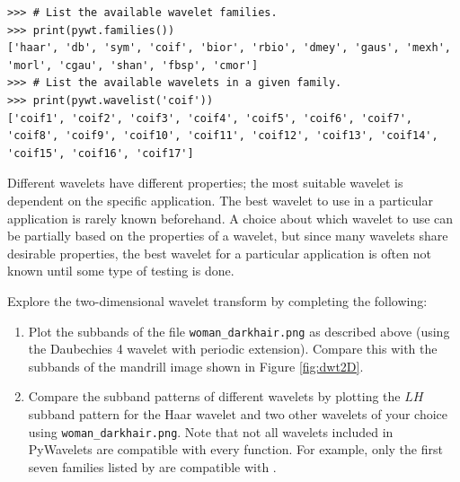 \begin{lstlisting}
>>> # List the available wavelet families.
>>> print(pywt.families())
['haar', 'db', 'sym', 'coif', 'bior', 'rbio', 'dmey', 'gaus', 'mexh', 'morl', 'cgau', 'shan', 'fbsp', 'cmor']
>>> # List the available wavelets in a given family.
>>> print(pywt.wavelist('coif'))
['coif1', 'coif2', 'coif3', 'coif4', 'coif5', 'coif6', 'coif7', 'coif8', 'coif9', 'coif10', 'coif11', 'coif12', 'coif13', 'coif14', 'coif15', 'coif16', 'coif17']
\end{lstlisting}

Different wavelets have different properties; the most suitable wavelet is dependent on the specific application.
The best wavelet to use in a particular application is rarely known beforehand.
A choice about which wavelet to use can be partially based on the properties of a wavelet, but since many wavelets share desirable properties, the best wavelet for a particular application is often not known until
some type of testing is done.

\begin{problem}
Explore the two-dimensional wavelet transform by completing the following:
\begin{enumerate}
    \item Plot the subbands of the file \texttt{woman\_darkhair.png} as described above (using the Daubechies 4 wavelet with periodic extension).
        Compare this with the subbands of the mandrill image shown in Figure \ref{fig:dwt2D}.
    \item Compare the subband patterns of different wavelets by plotting the $LH$ subband pattern for the Haar wavelet and two other wavelets of your choice using \texttt{woman\_darkhair.png}.
        Note that not all wavelets included in PyWavelets are compatible with every function.
        For example, only the first seven families listed by  are compatible with .
\end{enumerate}
\end{problem}

